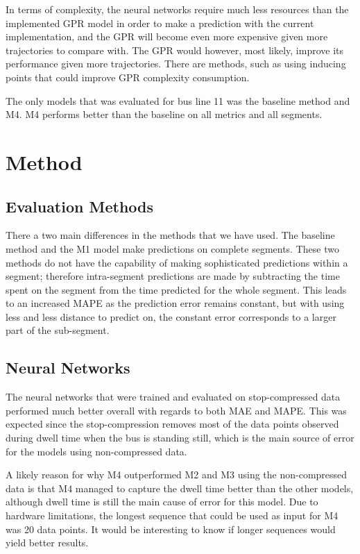 In terms of complexity, the neural networks require much less resources than the implemented GPR model in order to make a prediction with the current implementation, and the GPR will become even more expensive given more trajectories to compare with. The GPR would however, most likely, improve its performance given more trajectories. There are methods, such as using inducing points that could improve GPR complexity consumption.

The only models that was evaluated for bus line 11 was the baseline method and M4. M4 performs better than the baseline on all metrics and all segments. 

\section{Method}
\label{sec:discussion-method}
\subsection{Evaluation Methods}
There a two main differences in the methods that we have used. The baseline method and the M1 model make predictions on complete segments. These two methods do not have the capability of making sophisticated predictions within a segment; therefore intra-segment predictions are made by subtracting the time spent on the segment from the time predicted for the whole segment. This leads to an increased MAPE as the prediction error remains constant, but with using less and less distance to predict on, the constant error corresponds to a larger part of the sub-segment.

\subsection{Neural Networks}
The neural networks that were trained and evaluated on stop-compressed data performed much better overall with regards to both MAE and MAPE. This was expected since the stop-compression removes most of the data points observed during dwell time when the bus is standing still, which is the main source of error for the models using non-compressed data. 

A likely reason for why M4 outperformed M2 and M3 using the non-compressed data is that M4 managed to capture the dwell time better than the other models, although dwell time is still the main cause of error for this model. Due to hardware limitations, the longest sequence that could be used as input for M4 was 20 data points. It would be interesting to know if longer sequences would yield better results.

